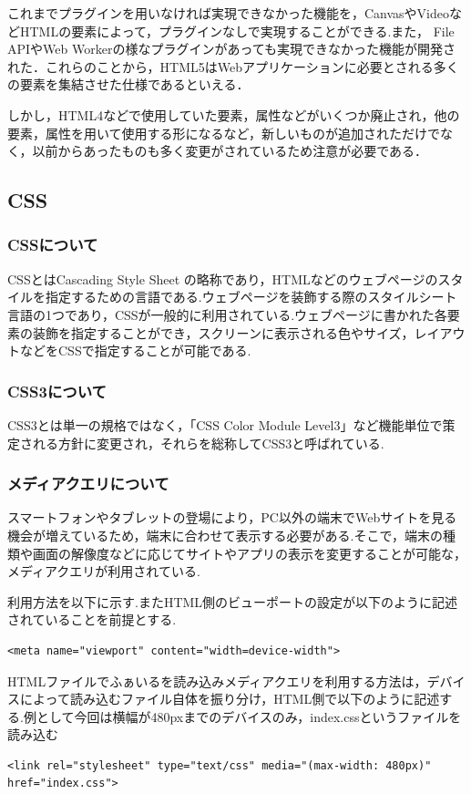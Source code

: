 \documentclass[a4j,12pt]{jarticle}
\begin{document}
これまでプラグインを用いなければ実現できなかった機能を，CanvasやVideoなどHTMLの要素によって，プラグインなしで実現することができる.また，
File APIやWeb Workerの様なプラグインがあっても実現できなかった機能が開発された．これらのことから，HTML5はWebアプリケーションに必要とされる多くの要素を集結させた仕様であるといえる．

しかし，HTML4などで使用していた要素，属性などがいくつか廃止され，他の要素，属性を用いて使用する形になるなど，新しいものが追加されただけでなく，以前からあったものも多く変更がされているため注意が必要である\cite{ren8}．
\newpage
\subsection{CSS}
\subsubsection{CSSについて}
CSSとはCascading Style Sheet の略称であり，HTMLなどのウェブページのスタイルを指定するための言語である.ウェブページを装飾する際のスタイルシート言語の1つであり，CSSが一般的に利用されている.ウェブページに書かれた各要素の装飾を指定することができ，スクリーンに表示される色やサイズ，レイアウトなどをCSSで指定することが可能である.
\subsubsection{CSS3について}
CSS3とは単一の規格ではなく，「CSS Color Module Level3」など機能単位で策定される方針に変更され，それらを総称してCSS3と呼ばれている.
\subsubsection{メディアクエリについて}
スマートフォンやタブレットの登場により，PC以外の端末でWebサイトを見る機会が増えているため，端末に合わせて表示する必要がある.そこで，端末の種類や画面の解像度などに応じてサイトやアプリの表示を変更することが可能な，メディアクエリが利用されている\cite{ren9}.

利用方法を以下に示す.またHTML側のビューポートの設定が以下のように記述されていることを前提とする.
\begin{lstlisting}[caption=ほげほげ,label=s1]
<meta name="viewport" content="width=device-width">
  \end{lstlisting}

HTMLファイルでふぁいるを読み込みメディアクエリを利用する方法は，デバイスによって読み込むファイル自体を振り分け，HTML側で以下のように記述する.例として今回は横幅が480pxまでのデバイスのみ，index.cssというファイルを読み込む
\begin{lstlisting}[caption=ファイルを読み込む,label=s2]
 <link rel="stylesheet" type="text/css" media="(max-width: 480px)" href="index.css">  \end{lstlisting}
 
\end{document}
